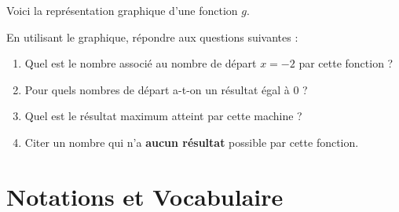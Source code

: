\documentclass[a4paper]{book}
\begin{document}
    \begin{exercice}
        Voici la représentation graphique d'une fonction $g$.
        
        \begin{center}
        \end{center}
    
    
        En utilisant le graphique, répondre aux questions suivantes :
        \begin{enumerate}
            \item Quel est le nombre associé au nombre de départ $x = -2$ par cette fonction ? \dotfill
            \item Pour quels nombres de départ a-t-on un résultat égal à $0$ ? \dotfill
            \item Quel est le résultat maximum atteint par cette machine ? \dotfill
            \item Citer un nombre qui n'a \textbf{aucun résultat} possible par cette fonction. \dotfill
        \end{enumerate}
    \end{exercice}

    
\section{Notations et Vocabulaire}
\end{document}
